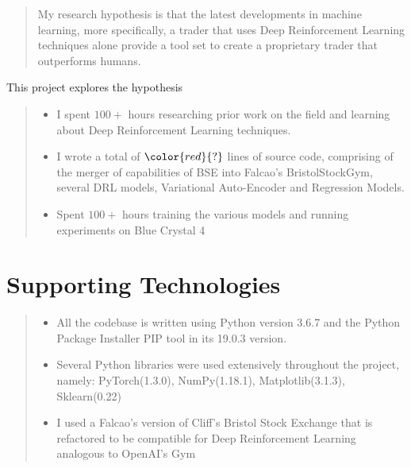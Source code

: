 \documentclass[ %
                    author={Ashwinder Khurana},
                supervisor={Prof Dave Cliff},
                    degree={MEng},
                     title={The Deeply Reinforced Trader},
                  subtitle={},
                      type={enterprise},
                      year={2020} ]{dissertation}
\begin{document}
\begin{quote}
My research hypothesis is that the latest developments in machine learning, more specifically, a trader that uses Deep Reinforcement Learning techniques alone provide a tool set to create a proprietary trader that outperforms humans.  
\end{quote}

\noindent
This project explores the hypothesis 


\begin{quote}
\noindent
\begin{itemize}
\item I spent $100+$ hours researching prior work on the field and learning about Deep Reinforcement Learning techniques. 
\item I wrote a total of $\color{red}{?}$ lines of source code, comprising of the merger of capabilities of BSE into Falcao's BristolStockGym, several DRL models, Variational Auto-Encoder and Regression Models.
\item Spent $100+$ hours training the various models and running experiments on Blue Crystal 4 \cite{BC4} 
\end{itemize}
\end{quote}


\chapter*{Supporting Technologies}

\begin{quote}
\noindent
\begin{itemize}
\item All the codebase is written using Python version 3.6.7 and the Python Package Installer PIP tool in its 19.0.3 version.
\item Several Python libraries were used extensively throughout the project, namely: PyTorch(1.3.0), NumPy(1.18.1), Matplotlib(3.1.3), Sklearn(0.22)
\item I used a Falcao's version of Cliff's Bristol Stock Exchange that is refactored to be compatible for Deep Reinforcement Learning analogous to OpenAI's Gym 

\end{itemize}
\end{quote}

\end{document}
